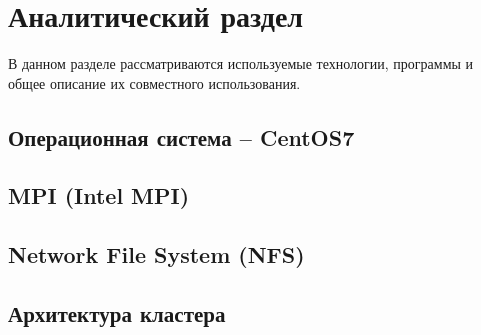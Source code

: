 \chapter{Аналитический раздел}
\label{cha:analysis}

В данном разделе рассматриваются используемые технологии, программы и общее
описание их совместного использования.

\section{Операционная система -- CentOS7}

\section{MPI (Intel MPI)}

\section{Network File System (NFS)}

\section{Архитектура кластера}
